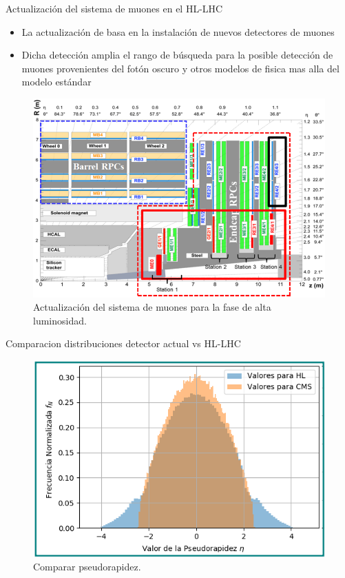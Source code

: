 \begin{frame}{Actualizaci\'on del sistema de muones en el HL-LHC}

\begin{itemize}
\item La actualizaci\'on de basa en la instalaci\'on de nuevos detectores de muones 
\item Dicha detecci\'on amplia el rango de b\'usqueda para la posible detecci\'on de muones provenientes del fot\'on oscuro y otros modelos de fisica mas alla del modelo est\'andar
\end{itemize}

\begin{figure}
\centering
\includegraphics[width=.6\textwidth]{Imag/muon_phase-2.png}
\caption{Actualizaci\'on del sistema de muones para la fase de alta luminosidad.}
\end{figure}

\end{frame}


\begin{frame}{Comparacion distribuciones detector actual vs HL-LHC}
\begin{figure}
\centering
\includegraphics[width=.8\textwidth]{Imag/Datos_Eta_ALL_simple.png}
\caption{Comparar pseudorapidez.}
\end{figure}  
\end{frame}

